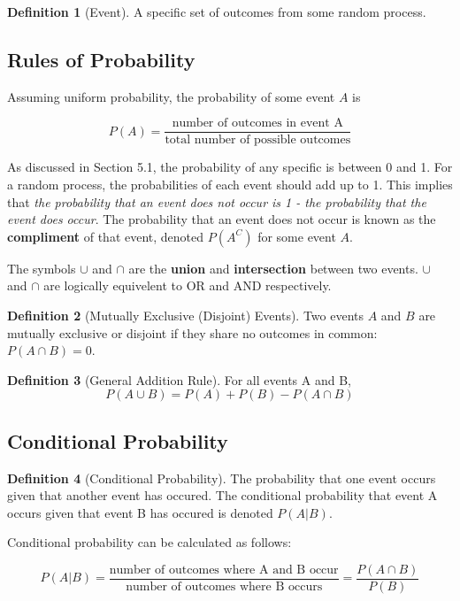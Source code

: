 \documentclass[12pt, a4paper]{article}
\theoremstyle{definition}
\newtheorem{definition}{Definition}
\begin{document}
\begin{definition}[Event]
    A specific set of outcomes from some random process.
\end{definition}

\subsection{Rules of Probability}
Assuming uniform probability, the probability of some event $A$ is

\[P(A) = \frac{\textrm{number of outcomes in event A}}{\textrm{total number of possible outcomes}}\]

As discussed in Section 5.1, the probability of any specific is between 0 and 1.
For a random process, the probabilities of each event should add up to 1.
This implies that \textit{the probability that an event does not occur is 1 - the probability that the event does occur}.
The probability that an event does not occur is known as the \textbf{compliment} of that event, denoted $P(A^C)$ for some event $A$.

The symbols $\cup$ and $\cap$ are the \textbf{union} and \textbf{intersection} between two events.
$\cup$ and $\cap$ are logically equivelent to OR and AND respectively.

\begin{definition}[Mutually Exclusive (Disjoint) Events]
    Two events $A$ and $B$ are mutually exclusive or disjoint if they share no outcomes in common: $P(A \cap B) = 0$.
\end{definition}

\begin{definition}[General Addition Rule]
    For all events A and B,
    \[P(A \cup B) = P(A) + P(B) - P(A \cap B)\]
\end{definition}

\subsection{Conditional Probability}

\begin{definition}[Conditional Probability]
    The probability that one event occurs given that another event has occured.
    The conditional probability that event A occurs given that event B has occured is denoted $P(A | B)$.
\end{definition}

Conditional probability can be calculated as follows:

\[P(A | B) = \frac{\textrm{number of outcomes where A and B occur}}{\textrm{number of outcomes where B occurs}} = \frac{P(A \cap B)}{P(B)}\]
\end{document}
